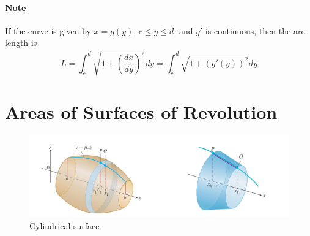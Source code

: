 \documentclass[12pt]{article}
\begin{document}
\paragraph{Note} If the curve is given by $x = g(y)$, $c \leq y \leq d$, and $g'$ is continuous, then 
the arc length is 
\[
    L = \int_c^d \sqrt{1 + \left(\frac{dx}{dy} \right)^2} dy = \int_c^d \sqrt{1 + (g'(y))^2} dy
\]
\section{Areas of Surfaces of Revolution}
\begin{figure}[H]
    \centering
    \includegraphics[width = 0.8\linewidth]{Images/solid surface.png}
    \caption{Cylindrical surface}
\end{figure}
\end{document}
